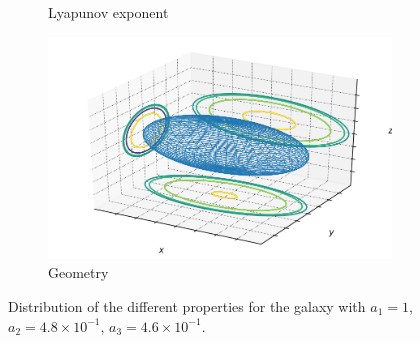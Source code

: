 \begin{figure}[h]
\begin{subfigure}[t]{0.4\textwidth}
        \caption{Lyapunov exponent}
    \end{subfigure}
    \begin{subfigure}[t]{0.4\textwidth}
        \includegraphics[width=\textwidth]{"../Files/Week 13/images/0_ellipsoid"}
        \caption{Geometry}
    \end{subfigure}
    \caption{Distribution of the different properties for the galaxy with $a_1 = 1$, $a_2 = 4.8\times10^{-1}$, $a_3 = 4.6\times10^{-1}$.}
    \label{fig: g23}
\end{figure}


